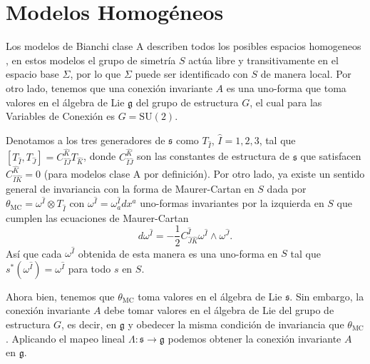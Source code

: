 
\section{Modelos Homog\'{e}neos}

Los modelos de Bianchi clase A describen todos los posibles espacios homogeneos \cite{Wald}, en estos modelos el grupo de simetr\'{i}a $S$ act\'{u}a libre y transitivamente en el espacio base $\Sigma$, por lo que $\Sigma$ puede ser identificado con $S$ de manera local. Por otro lado, tenemos que una conexi\'{o}n invariante $A$ es una uno-forma que toma valores en el \'{a}lgebra de Lie $\mathfrak{g}$ del grupo de estructura $G$, el cual para las Variables de Conexi\'{o}n es $G=\mathrm{SU}(2)$.

Denotamos a los tres generadores de $\mathfrak{s}$ como $T_{\hat{I}}$, $\hat{I}=1,2,3$, tal que $\left[ T_{\hat{I}}, T_{\hat{J}} \right] = C^{\hat{K}}_{\hat{I}\hat{J}} T_{\hat{K}}$, donde $C^{\hat{K}}_{\hat{I}\hat{J}}$ son las constantes de estructura de $\mathfrak{s}$ que satisfacen $C^{\hat{K}}_{\hat{I}\hat{K}} = 0$ (para modelos clase A por definici\'{o}n). Por otro lado, ya existe un sentido general de invariancia con la forma de Maurer-Cartan en $S$ dada por $\theta_{\mathrm{MC}} = \omega^{\hat{I}} \otimes T_{\hat{I}}$ con $\omega^{\hat{I}} = \omega^{\hat{I}}_{a} dx^{a}$ uno-formas invariantes por la izquierda en $S$ que cumplen las ecuaciones de Maurer-Cartan
%
\begin{equation}
d \omega^{\hat{I}} = -\frac{1}{2} C^{\hat{I}}_{\hat{J} \hat{K}} \omega^{\hat{I}} \wedge \omega^{\hat{J}}.
\end{equation}
%
As\'{i} que cada $\omega^{\hat{I}}$ obtenida de esta manera es una uno-forma en $S$ tal que $s^{*}(\omega^{\hat{I}}) = \omega^{\hat{I}}$ para todo $s$ en $S$.

Ahora bien, tenemos que $\theta_{\mathrm{MC}}$ toma valores en el \'{a}lgebra de Lie $\mathfrak{s}$. Sin embargo, la conexi\'{o}n invariante $A$ debe tomar valores en el \'{a}lgebra de Lie del grupo de estructura $G$, es decir, en $\mathfrak{g}$ y obedecer la misma condici\'{o}n de invariancia que $\theta_{\mathrm{MC}}$. Aplicando el mapeo lineal $\Lambda: \mathfrak{s} \longrightarrow \mathfrak{g}$ podemos obtener la conexi\'{o}n invariante $A$ en $\mathfrak{g}$.

